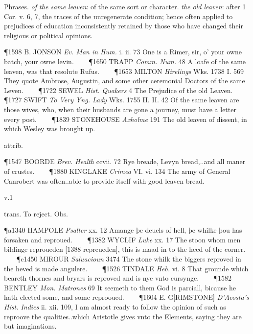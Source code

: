 \begin{description}[wide, labelwidth=!, labelindent=0pt]
\begin{myenumerate}
 Phrases. \textit{of the same leaven}: of the same sort or character. \textit{the old leaven}: after 1 Cor. v. 6, 7, the traces of the unregenerate condition; hence often applied to prejudices of education inconsistently retained by those who have changed their religious or political opinions.

\P 1598 B. JONSON  \textit{Ev. Man in Hum.} i. ii. 73 One is a Rimer, sir, o' your owne batch, your owne levin.    
\P 1650 TRAPP  \textit{Comm. Num.} 48 A loafe of the same leaven, was that resolute Rufus.    
\P 1653 MILTON \textit{Hirelings} Wks. 1738 I. 569  They quote Ambrose, Augustin, and some other ceremonial Doctors of the same Leven.    
\P 1722 SEWEL  \textit{Hist. Quakers} 4 The Prejudice of the old Leaven.    
\P 1727 SWIFT  \textit{To Very Yng. Lady} Wks. 1755 II. II.  42 Of the same leaven are those wives, who, when their husbands are gone a journey, must have a letter every post.    
\P 1839 STONEHOUSE  \textit{Axholme} 191 The old leaven of dissent, in which Wesley was brought up.

 attrib.

\P 1547 BOORDE  \textit{Brev. Health} ccvii. 72 Rye breade, Levyn bread,..and all maner of crustes.    
\P 1880 KINGLAKE  \textit{Crimea} VI. vi. 134 The army of General Canrobert was often..able to provide itself with good leaven bread.
\end{myenumerate}



 v.1

\noindent {}

\vspace{-0.3cm}

\begin{myenumerate}

 trans. To reject. Obs.

\P a1340 HAMPOLE  \textit{Psalter} xx. 12 Amange þe deuels of hell, þe whilke þou has forsaken and reproued.    
\P 1382 WYCLIF  \textit{Luke} xx. 17 The stoon whom men bildinge reproueden [1388 repreueden],  this is maad in to the heed of the corner.    
\P c1450 MIROUR  \textit{Saluacioun} 3474 The stone whilk the biggers reproved in the heved is made angulere.    
\P 1526 TINDALE  \textit{Heb.} vi. 8 That grounde which beareth thornes and bryars is reproved and is nye vnto cursynge.    
\P 1582 BENTLEY  \textit{Mon. Matrones} 69 It seemeth to them God is parciall, bicause he hath elected some, and some reprooued.    
\P 1604 E. G[RIMSTONE]  \textit{D'Acosta's Hist. Indies} ii. xii. 109, I am almost ready to follow the opinion of such as reproove the qualities..which Aristotle gives vnto the Elements, saying they are but imaginations.


\end{myenumerate}
\end{description}

